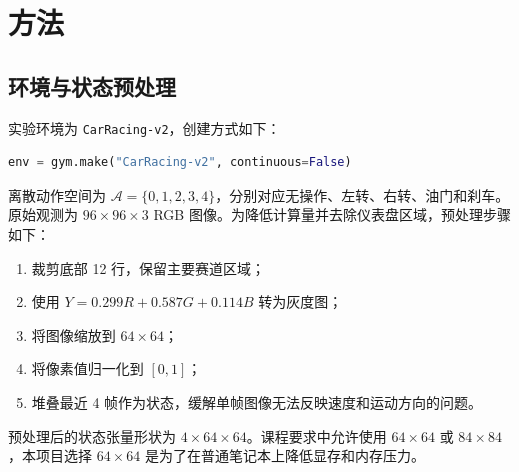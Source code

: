 \documentclass[UTF8,a4paper,12pt]{ctexart}
\begin{document}
\section{方法}

\subsection{环境与状态预处理}

实验环境为 \texttt{CarRacing-v2}，创建方式如下：

\begin{lstlisting}[language=Python]
env = gym.make("CarRacing-v2", continuous=False)
\end{lstlisting}

离散动作空间为 $\mathcal{A}=\{0,1,2,3,4\}$，分别对应无操作、左转、右转、油门和刹车。原始观测为 $96 \times 96 \times 3$ RGB 图像。为降低计算量并去除仪表盘区域，预处理步骤如下：

\begin{enumerate}
  \item 裁剪底部 12 行，保留主要赛道区域；
  \item 使用 $Y=0.299R+0.587G+0.114B$ 转为灰度图；
  \item 将图像缩放到 $64 \times 64$；
  \item 将像素值归一化到 $[0,1]$；
  \item 堆叠最近 4 帧作为状态，缓解单帧图像无法反映速度和运动方向的问题。
\end{enumerate}

预处理后的状态张量形状为 $4 \times 64 \times 64$。课程要求中允许使用 $64 \times 64$ 或 $84 \times 84$，本项目选择 $64 \times 64$ 是为了在普通笔记本上降低显存和内存压力。
\end{document}
